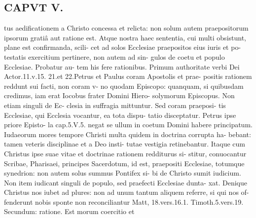 \documentclass{article}
\begin{document}
\begin{pages}
\section*{CAPVT  V. }
\marginpar{[ p.245 ]}tus aedificationem a Christo concessa et relicta: non solum autem praepositorum ipsorum gratiâ aut ratione est. Atque nostra haec sententia, cui multi obsistunt, plane est confirmanda, scili- cet ad solos Ecclesiae praepositos eius iuris et po- testatis exercitium pertinere, non autem ad sin- gulos de coetu et populo Ecclesiae. Probatur au- tem his fere rationibus. Primum authoritate verbi Dei Actor.11.v.15. 21.et 22.Petrus et Paulus coram Apostolis et prae- positis rationem reddunt sui facti, non coram v- no quodam Episcopo: quanquam, si quibusdam credimus, iam erat Iocobus frater Domini Hiero- solymorum Episcopus. Non etiam singuli de Ec- clesia in suffragia mittuntur. Sed coram praeposi- tis Ecclesiae, qui Ecclesia vocantur, ea tota dispu- tatio disceptatur. Petrus ipse priore Episto- la cap.5.V.5. negat se ullum in coetum Domini habere principatum. Iudaeorum mores tempore Christi multa quidem in doctrina corrupta ha- bebant: tamen veteris disciplinae et a Deo insti- tutae vestigia retinebantur. Itaque cum Christus ipse suae vitae et doctrinae rationem redditurus si- stitur, conuocantur Scribae, Pharisaei, principes Sacerdotum, id est, praepositi Ecclesiae, totumque synedrion: non autem solus summus Pontifex si- bi de Christo sumit iudicium. Non item iudicant singuli de populo, sed praefecti Ecclesiae dunta- xat. Denique Christus nos iubet ad plures: non ad unum tantum aliquem referre, si qui nos of- fenderunt nobis sponte non reconciliantur Matt, 18.vers.16.1. Timoth.5.vers.19. Secundum: ratione. Est morum coercitio et 

\end{pages}
\end{document}
